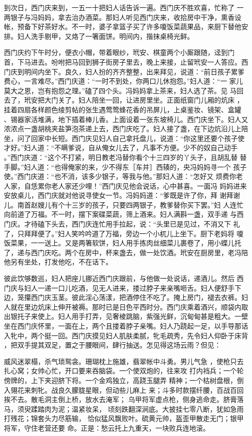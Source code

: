 到次日，西门庆来到，一五一十把妇人话告诉一遍。西门庆不胜欢喜，忙称了
一两银子与冯妈妈，拿去治办酒菜。那妇人听见西门庆来，收拾房中干净，熏香设
帐，预备下好茶好水。不一时，婆子拿篮子买了许多嗄饭菜蔬果品，来厨下替他安
排。妇人洗手剔甲，又烙了一箸面饼。明间内，揩抹桌椅光鲜。

西门庆约下午时分，便衣小帽，带着眼纱，玳安、棋童两个小厮跟随，迳到门
首，下马进去。吩咐把马回到狮子街房子里去，晚上来接，止留玳安一人答应。西
门庆到明间内坐下。良久，妇人扮的齐齐整整，出来拜见，说道：“前日孩子累爹
费心，一言难尽。”西门庆道：“一时不到处，你两口儿休抱怨。”妇人道：“一
家儿莫大之恩，岂有抱怨之理。”磕了四个头。冯妈妈拿上茶来，妇人选了茶。见
马回去了，玳安把大门关了。妇人陪坐一回，让进房里坐。正面纸窗门儿厢的炕床
，挂着四扇各样颜色绫剪帖的张生遇莺莺蜂花香的吊屏儿，上桌鉴妆、镜架、盒罐
、锡器家活堆满，地下插着棒儿香。上面设着一张东坡椅儿。西门庆坐下。妇人又
浓浓点一盏胡桃夹盐笋泡茶递上去，西门庆吃了。妇人接了盏，在下边炕沿儿上陪
坐，问了回家中长短。西门庆见妇人自己拿托盘儿，说道：“你这里还要个孩子使
才好。”妇人道：“不瞒爹说，自从俺女儿去了，凡事不方便。少不的奴自己动手
。”西门庆道：“这个不打紧，明日教老冯替你看个十三四岁的丫头子，且胡乱替
替手脚。”妇人道：“也得俺家的来，少不得东［车并］西辏的，央冯妈妈寻一个
孩子使。”西门庆道：“也不消，该多少银子，等我与他。”那妇人道：“怎好又
烦费你老人家，自恁累你老人家还少哩！”西门庆见他会说话，心中甚喜。一面冯
妈妈进来安放桌儿，西门庆就对他说寻使女一节。冯妈妈道：“爹既是许了你，拜
谢拜谢儿。南首赵嫂儿有个十三岁的孩子，只要四两银子，教爹替你买下罢。”妇
人连忙向前道了万福。不一时，摆下案碟菜蔬，筛上酒来。妇人满斟一盏，双手递
与西门庆。才待磕下头去，西门庆连忙用手拉起，说：“头里已是见过，不消又下
礼了，只拜拜便了。”妇人笑吟吟道了万福，旁边一个小杌儿上坐下。厨下老妈将
嗄饭菜果，一一送上。又是两箸软饼，妇人用手拣肉丝细菜儿裹卷了，用小蝶儿托
了，递与西门庆吃。两个在房中，杯来盏去，做一处饮酒。玳安在厨房里，老冯陪
他另有坐处，打发他吃，不在话下。

彼此饮够数巡，妇人把座儿挪近西门庆跟前，与他做一处说话，递酒儿。然后
西门庆与妇人一递一口儿吃酒，见无人进来，搂过脖子来亲嘴咂舌。妇人便舒手下
边，笼攥西门庆玉茎。彼此淫心荡漾，把酒停住不吃了。掩上房门，褪去衣裤。妇
人就在里边炕床上伸开被褥。那时已是日色平西时分。西门庆乘着酒兴，顺袋内取
出银托子来使上。妇人用手打弄，见奢棱跳脑，紫强光鲜，沉甸甸甚是粗大。一壁
坐在西门庆怀里，一面在上，两个且搂着脖子亲嘴。妇人乃跷起一足，以手导那话
入牝中，两个挺一回。西门庆摸见妇人肌肤柔腻，牝毛疏秀，先令妇人仰卧于床背
，把双手提其双足，置之于腰眼间，肆行抽送。怎见得这场云雨？但见：

威风迷翠榻，杀气琐鸳衾。珊瑚枕上施雄，翡翠帐中斗勇。男儿气急
，使枪只去扎心窝；女帅心忙，开口要来吞脑袋。一个使双炮的，往来攻
打内裆兵；一个轮傍牌的，上下夹迎脐下将。一个金鸡独立，高跷玉腿弄
精神；一个枯树盘根，倒入翎花来刺牝。战良久朦胧星眼，但动些儿麻上
来；斗多时款摆纤腰，百战百回挨不去。散毛洞主倒上桥，放水去淹军；
乌甲将军虚点枪，侧身逃命走。脐膏落马，须臾蹂踏肉为泥；温紧妆呆，
顷刻跌翻深涧底。大披挂七零八断，犹如急雨打残花；锦套头力尽筋输，
恰似猛风飘败叶。硫黄元帅，盔歪甲散走无门；银甲将军，守住老营还要
命。正是：愁云托上九重天，一块败兵连地滚。

